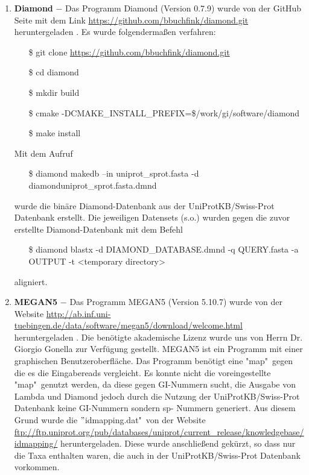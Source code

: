 \documentclass[10pt, a4paper]{article}[08.12.2015]
\begin{document}
\begin{enumerate}
          
          \item \textbf{Diamond} $-$ Das Programm Diamond (Version 0.7.9) 				  wurde 
          von der GitHub Seite mit dem Link
          \url{https://github.com/bbuchfink/diamond.git} heruntergeladen
          \cite{buchfink2014}. Es wurde folgenderma\ss{en} verfahren:
          \begin{itemize}
            \item[\$] git clone \url{https://github.com/bbuchfink/diamond.git}
            \item[\$] cd diamond
            \item[\$] mkdir build
            \item[\$] cmake 																-DCMAKE\_INSTALL\_PREFIX=\$/work/gi/software/diamond
            \item[\$] make install
		  \end{itemize}
		  Mit dem Aufruf
		  \begin{itemize}
		    \item[\$] diamond makedb --in uniprot\_sprot.fasta -d 							diamonduniprot\_sprot.fasta.dmnd
		  \end{itemize}
		  wurde die bin\"are Diamond-Datenbank aus der UniProtKB/Swiss-Prot
		  Datenbank erstellt.\newline
		  Die jeweiligen Datensets (s.o.) wurden gegen die zuvor erstellte 				  Diamond-Datenbank mit dem Befehl
		  \begin{itemize}
		    \item[\$] diamond blastx -d DIAMOND\_DATABASE.dmnd -q QUERY.fasta 				-a OUTPUT -t <temporary directory> 
		  \end{itemize}
		  aligniert.		             
          
          \item \textbf{MEGAN5} $-$ Das Programm MEGAN5 (Version 5.10.7) wurde 
          von der Website \url{http://ab.inf.uni-										  tuebingen.de/data/software/megan5/download/welcome.html}
          heruntergeladen \cite{huson2011}. Die ben\"otigte akademische
          Lizenz wurde uns von Herrn Dr. Giorgio Gonella zur Verf\"ugung 
          gestellt. MEGAN5 ist ein Programm mit einer graphischen 						  Benutzeroberfl\"ache. Das Programm ben\"otigt eine "map"\ gegen die
          es die Eingabereads vergleicht. Es konnte nicht die 				  			  voreingestellte "map"\ genutzt werden, da diese gegen GI-Nummern 				  sucht, die Ausgabe von Lambda und Diamond jedoch durch die Nutzung 			  der UniProtKB/Swiss-Prot Datenbank keine GI-Nummern sondern sp-				  Nummern generiert. Aus diesem Grund wurde die $"$idmapping.dat"\ von 		  der Website 									\url{ftp://ftp.uniprot.org/pub/databases/uniprot/current_release/knowledgebase/idmapping/} 		  heruntergeladen. Diese wurde anschlie{\ss}end gek\"urzt, so dass nur 		  die Taxa enthalten waren, die auch in der UniProtKB/Swiss-Prot 				  Datenbank vorkommen. 
          
        \end{enumerate}
\end{document}
